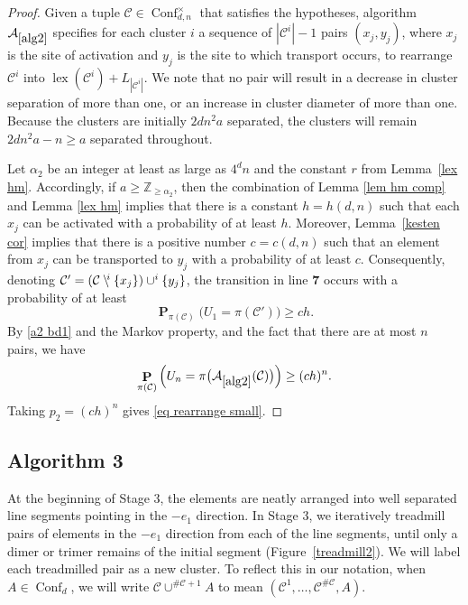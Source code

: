 \documentclass[11pt,reqno]{amsart}
\theoremstyle{definition}
\numberwithin{equation}{section}
\newcommand{\Z}{\mathbb{Z}}
\newcommand{\1}{\mathbf{1}}
\DeclareMathOperator{\PP}{\mathbf{P}}
\DeclareMathOperator{\lex}{lex}
\newcommand{\sd}[1]{\setminus^{\hspace{-0.2em} #1}}
\newcommand{\CC}{\mathcal{C}}
\DeclareMathOperator{\Conf}{\mathrm{Conf}}
\begin{document}
\begin{proof}
Given a tuple $\CC \in \Conf_{d,n}^\times$ that satisfies the hypotheses, algorithm $\mathcal{A}_{\ref{alg2}}$ specifies for each cluster $i$ a sequence of $|\CC^i|-1$ pairs $(x_j,y_j)$, where $x_j$ is the site of activation and $y_j$ is the site to which transport occurs, to rearrange $\CC^i$ into $\lex (\CC^i) + L_{|\CC^i|}$. We note that no pair will result in a decrease in cluster separation of more than one, or an increase in cluster diameter of more than one. Because the clusters are initially $2 dn^2 a$ separated, the clusters will remain $2dn^2 a - n \geq a$ separated throughout.

Let $\alpha_2$ be an integer at least as large as $4^dn$ and the constant $r$ from Lemma~\ref{lex hm}. Accordingly, if $a \geq \Z_{\geq \alpha_2}$, then the combination of Lemma \ref{lem hm comp} and Lemma \ref{lex hm} implies that there is a constant $h = h (d,n)$ such that each $x_j$ can be activated with a probability of at least $h$. Moreover, Lemma~\ref{kesten cor} implies that there is a positive number $c = c (d,n)$ such that an element from $x_j$ can be transported to $y_j$ with a probability of at least $c$. Consequently, denoting $\CC' = (\CC \sd{i} \{x_j\}) \cup^i \{y_j\}$, the transition in line {\bf 7} occurs with a probability of at least
\begin{equation}\label{a2 bd1}
\PP_{\pi (\CC)} \big( U_1 = \pi (\CC') \big) \geq c h.
\end{equation}
By \eqref{a2 bd1} and the Markov property, and the fact that there are at most $n$ pairs, we have
\[
\PP_{\pi (\CC)} \Big( U_n = \pi \big( \mathcal{A}_{\ref{alg2}} (\CC) \big) \Big) \geq (ch)^n.
\] Taking $p_2 = (ch)^n$ gives \eqref{eq rearrange small}.
\end{proof}

\subsection{Algorithm 3}\label{sec alg3}

At the beginning of Stage 3, the elements are neatly arranged into well separated line segments pointing in the $-e_1$ direction. In Stage 3, we iteratively treadmill pairs of elements in the $-e_1$ direction from each of the line segments, until only a dimer or trimer remains of the initial segment (Figure~\ref{treadmill2}). We will label each treadmilled pair as a new cluster. To reflect this in our notation, when $A \in \Conf_d$, we will write $\CC \cup^{\# \CC +1} A$ to mean $(\CC^1, \dots, \CC^{\# \CC}, A)$.
\end{document}
